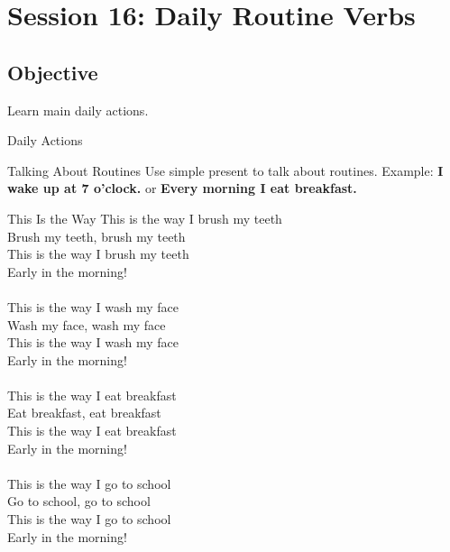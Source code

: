 \section*{Session 16: Daily Routine Verbs}

\subsection*{Objective}
Learn main daily actions.

\begin{vocabcard}{Daily Actions}
\end{vocabcard}

\begin{grammartip}{Talking About Routines}
  Use simple present to talk about routines. Example: \textbf{I wake up at 7 o'clock.} or \textbf{Every morning I eat breakfast.}
\end{grammartip}

\begin{songbox}{This Is the Way}
  This is the way I brush my teeth \\
  Brush my teeth, brush my teeth \\
  This is the way I brush my teeth \\
  Early in the morning! \\
  \\
  This is the way I wash my face \\
  Wash my face, wash my face \\
  This is the way I wash my face \\
  Early in the morning! \\
  \\
  This is the way I eat breakfast \\
  Eat breakfast, eat breakfast \\
  This is the way I eat breakfast \\
  Early in the morning! \\
  \\
  This is the way I go to school \\
  Go to school, go to school \\
  This is the way I go to school \\
  Early in the morning!
\end{songbox}

